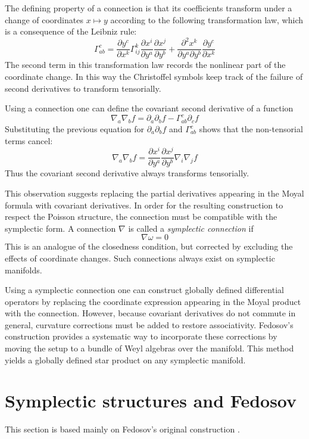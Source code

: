 \documentclass[
  12pt,
  a4paper, oneside
]{report}
\theoremstyle{bolddef}
\theoremstyle{remark}
\numberwithin{equation}{chapter}
\begin{document}
The defining property of a connection is that its coefficients transform under a change of coordinates $x \mapsto y$ according to the following transformation law, which is a consequence of the Leibniz rule: 
\[
\Gamma^c_{ab}
=
\frac{\partial y^c}{\partial x^k}
\Gamma^k_{ij}
\frac{\partial x^i}{\partial y^a}
\frac{\partial x^j}{\partial y^b}
+
\frac{\partial^2 x^k}{\partial y^a \partial y^b}
\frac{\partial y^c}{\partial x^k}
\]
The second term in this transformation law records the nonlinear part of
the coordinate change. In this way the Christoffel symbols keep track of
the failure of second derivatives to transform tensorially.

Using a connection one can define the covariant second derivative of a
function
\[
\nabla_a \nabla_b f
=
\partial_a \partial_b f
-
\Gamma^c_{ab}\partial_c f
\]
Substituting the previous equation for $\partial_{a}\partial_{b}f$ and $\Gamma^c_{ab}$ shows that the non-tensorial terms cancel:
\[
\nabla_a \nabla_b f
=
\frac{\partial x^i}{\partial y^a}
\frac{\partial x^j}{\partial y^b}
\nabla_i \nabla_j f
\]
Thus the covariant second derivative always transforms tensorially. 

This observation suggests replacing the partial derivatives appearing in
the Moyal formula with covariant derivatives. In
order for the resulting construction to respect the Poisson structure,
the connection must be compatible with the symplectic form. A connection
$\nabla$ is called a \emph{symplectic connection} if
\begin{equation}\label{eq:symplectic-connection}
    \nabla \omega = 0 
\end{equation}
This is an analogue of the closedness condition, but corrected by excluding the effects of coordinate changes. Such connections always exist on symplectic manifolds\cite{Fedosov1994}.

Using a symplectic connection one can construct globally defined
differential operators by replacing the coordinate expression appearing in
the Moyal product with the connection. However, because covariant derivatives do
not commute in general, curvature corrections must be added to
restore associativity. Fedosov's construction provides a systematic way to incorporate these corrections by moving the setup to a bundle of Weyl algebras over the manifold. This method yields a globally defined star product on any symplectic manifold.
\section{Symplectic structures and Fedosov}
This section is based mainly on Fedosov's original construction \cite{Fedosov1994}.
\end{document}
